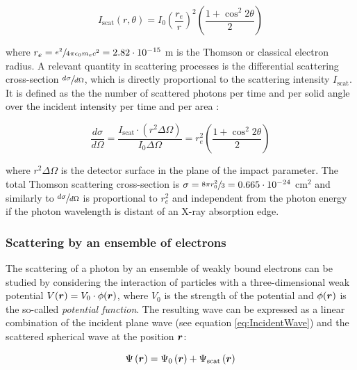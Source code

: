 \begin{equation}
        I_{\text{scat}}\left( r,\theta \right)= I_0 \left( \frac{r_e}{r} \right) ^2 \left( \frac{1+\cos^2{2\theta}}{2} \right)
\end{equation}

where $r_e= \sfrac{e^2}{4\pi\epsilon_0 m_e c^2}=2.82\cdot10^{-15}$ m is the Thomson or classical electron radius. A relevant quantity in scattering processes is the differential scattering cross-section $\sfrac{d\sigma}{d\Omega}$, which is directly proportional to the scattering intensity $I_{\text{scat}}$. It is defined as the the number of scattered photons per time and per solid angle over the incident intensity per time and per area \citep{als-nielsen_elements_2011}:

\begin{equation}
        \label{eq:thomson_cross_section}
        \frac{d\sigma}{d\Omega}= \frac{I_{\text{scat}} \cdot \left(r^2 \Delta \Omega \right)}{I_0\Delta \Omega}=r_e^2\left( \frac{1+\cos^2{2\theta}}{2} \right)
\end{equation}

where $r^2 \Delta \Omega$ is the detector surface in the plane of the impact parameter. The total Thomson scattering cross-section is $\sigma = \sfrac{8\pi r_0^2}{3} = 0.665\cdot10^{-24}$ cm$^2$ and similarly to $\sfrac{d\sigma}{d\Omega}$ is proportional to $r_e^2$ and independent from the photon energy if the photon wavelength is distant of an X-ray absorption edge.

\subsubsection{Scattering by an ensemble of electrons}

The scattering of a photon by an ensemble of weakly bound electrons can be studied by considering the interaction of particles with a three-dimensional weak potential $V(\bm{r})=V_0 \cdot \phi(\bm{r})$, where $V_0$ is the strength of the potential and $\phi(\bm{r})$ is the so-called \emph{potential function}. The resulting wave can be expressed as a linear combination of the incident plane wave (see equation \ref{eq:IncidentWave}) and the scattered spherical wave at the position $\bm{r}$:

\begin{equation}
       \Psi\left( \bm{r} \right)= \Psi_0\left( \bm{r} \right) +  \Psi_{\text{scat}}\left( \bm{r} \right)
\end{equation}

